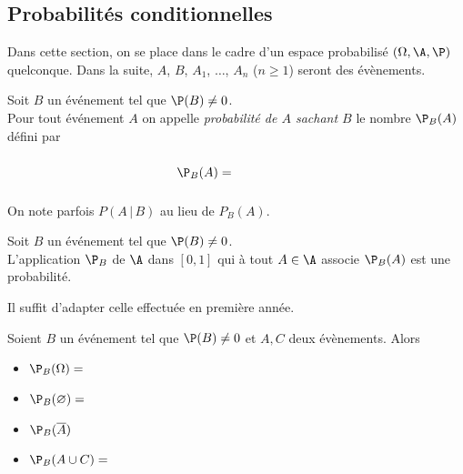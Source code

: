 \documentclass[a4paper,10pt]{report}
\begin{document}
\begin{itemize}
\section{Probabilités conditionnelles}
Dans cette section, on se place dans le cadre d'un espace probabilisé $(\Omega, \A, \P)$ quelconque. Dans la suite, $A$, $B$, $A_1$, $\ldots$, $A_n$ ($n \geq 1$) seront des évènements.

\begin{Definition}{}
Soit $B$ un événement tel que $\P(B) \neq 0$.\\
Pour tout événement $A$ on appelle \emph{probabilité de $A$ sachant $B$} le nombre $\P_B(A)$ défini par 

$$ \P_B(A) = \phantom{\frac{\P(A\cap B)}{\P(B)}}$$

\end{Definition}

\begin{Remarque}{} On note parfois $P(A \, \vert \, B)$ au lieu de $P_B(A)$.
\end{Remarque}


\begin{Proposition}{}
Soit $B$ un événement tel que $\P(B) \neq 0$.\\
L'application $\P_B$ de $\A$ dans $[0,1]$ qui à tout $A \in \A$ associe $\P_B(A)$ est une probabilité.
\end{Proposition}

\begin{Demonstration}{}
Il suffit d'adapter celle effectuée en première année.
\end{Demonstration}
\begin{Corollaire}{}
Soient $B$ un événement tel que $\P(B) \ne 0$ et $A,C$ deux évènements. Alors 
 \begin{itemize}
  \item $\P_B(\Omega) = $
  \item $\P_B(\varnothing) = $
  \item $\P_B(\overline{A})$
  \item $\P_B(A\cup C) = $
 \end{itemize}
\end{Corollaire}
%



\end{itemize}
\end{document}
